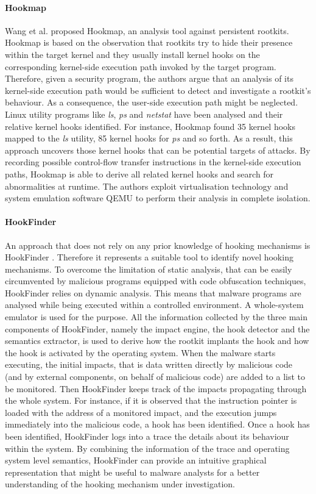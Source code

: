 \paragraph{Hookmap}
Wang et al. \cite{hookmap} proposed Hookmap, an analysis tool against persistent rootkits. Hookmap is based on the observation that rootkits try to hide their presence within the target kernel and they usually install kernel hooks on the corresponding kernel-side execution path invoked by the target program. Therefore, given a security program, the authors argue that an analysis of its kernel-side execution path would be sufficient to detect and investigate a rootkit's behaviour. As a consequence, the user-side execution path might be neglected. Linux utility programs like \emph{ls}, \emph{ps} and \emph{netstat} have been analysed and their relative kernel hooks identified. For instance, Hookmap found 35 kernel hooks mapped to the \emph{ls} utility, 85 kernel hooks for \emph{ps} and so forth. As a result, this approach uncovers those kernel hooks that can be potential targets of attacks. By recording possible control-flow transfer instructions in the kernel-side execution paths, Hookmap is able to derive all related kernel hooks and search for abnormalities at runtime. The authors exploit virtualisation technology and system emulation software QEMU to perform their analysis in complete isolation.

\paragraph{HookFinder}
An approach that does not rely on any prior knowledge of hooking mechanisms is HookFinder \cite{hookfinder}. Therefore it represents a suitable tool to identify novel hooking mechanisms. To overcome the limitation of static analysis, that can be easily circumvented by malicious programs equipped with code obfuscation techniques, HookFinder relies on dynamic analysis. This means that malware programs are analysed while being executed within a controlled environment. A whole-system emulator is used for the purpose. All the information collected by the three main components of HookFinder, namely the impact engine, the hook detector and the semantics extractor, is used to derive how the rootkit implants the hook and how the hook is activated by the operating system. When the malware starts executing, the initial impacts, that is data written directly by malicious code (and by external components, on behalf of malicious code) are added to a list to be monitored. Then HookFinder keeps track of the impacts propagating through the whole system. For instance, if it is observed that the instruction pointer is loaded with the address of a monitored impact, and the execution jumps immediately into the malicious code, a hook has been identified.
Once a hook has been identified, HookFinder logs into a trace the details about its behaviour within the system. By combining the information of the trace and operating system level semantics, HookFinder can provide an intuitive graphical representation that might be useful to malware analysts for a better understanding of the hooking mechanism under investigation.


